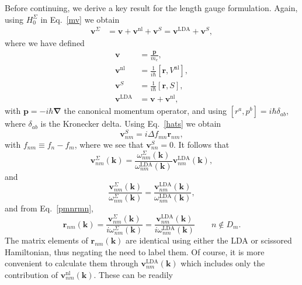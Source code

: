 \documentclass[floatfix,prb,aps,superscriptaddress,showpacs,letterpaper]{revtex4}
\begin{document}
Before continuing,
we derive a key result for the length gauge formulation. 
Again, using $H^\Sigma_0$ in
Eq.~\eqref{mv} we obtain
\begin{align}
\mathbf{v}^\Sigma&=
\mathbf{v} 
+
\mathbf{v}^\mathrm{nl} 
+\mathbf{v}^S
=
\mathbf{v}^\mathrm{LDA} 
+\mathbf{v}^S 
,
\label{vop2}
\end{align}
where we have defined 
\begin{align}
\mathbf{v} 
&=\frac{\mathbf{p}}{m_e},
\nonumber\\
\mathbf{v}^\mathrm{nl} 
&=
\frac{1}{i\hbar}[\mathbf{r},V^\mathrm{nl}],\label{vnl}
\\
\mathbf{v}^S
&=
\frac{1}{i\hbar}[\mathbf{r}, S],
\nonumber\\
\mathbf{v}^\mathrm{LDA} 
&=
\mathbf{v} 
+\mathbf{v}^\mathrm{nl}
,\nonumber
\end{align}  
with $\mathbf{p}=-i\hbar\boldsymbol{\nabla}$ the canonical momentum operator, 
and using $[r^a,p^b]=i\hbar\delta_{ab}$, where $\delta_{ab}$ is the Kronecker delta.
Using Eq.~\eqref{hats} we obtain 
\begin{equation}
\mathbf{v}^S_{nm}=i\Delta f_{mn}\mathbf{r}_{nm},
\label{chon.2} 
\end{equation}
with $f_{nm}\equiv f_n-f_m$,
where we see that $\mathbf{v}^S_{nn}=0$. It follows that
\begin{equation}
\mathbf{v}^\Sigma_{nm}(\mathbf{k}) 
=\frac{\omega^\Sigma_{nm}(\mathbf{k})}{\omega^\mathrm{LDA}_{nm}(\mathbf{k})}
\mathbf{v}^\mathrm{LDA}_{nm}(\mathbf{k}) 
,
\label{chon.9}
\end{equation}
and
\begin{equation*}
\frac{\mathbf{v}^\Sigma_{nm}(\mathbf{k})}{\omega^\Sigma_{nm}(\mathbf{k})}
=
\frac{\mathbf{v}^\mathrm{LDA}_{nm}(\mathbf{k})}{\omega^\mathrm{LDA}_{nm}(\mathbf{k})}
,
\end{equation*}
and from Eq.~\eqref{pmnrmn},
\begin{equation}
\mathbf{r}_{nm}(\mathbf{k}) 
=
\frac{\mathbf{v}^\Sigma_{nm}(\mathbf{k})}{i\omega^\Sigma_{nm}(\mathbf{k})}
=
\frac{\mathbf{v}^\mathrm{LDA}_{nm}(\mathbf{k})}{i\omega^\mathrm{LDA}_{nm}(\mathbf{k})}
\quad\quad n\notin D_m 
. 
\label{chon.10}
\end{equation}
The matrix elements 
of $\mathbf{r}_{nm}(\mathbf{k})$ are identical using either
the LDA or scissored
Hamiltonian, thus negating the need to label them.
Of course, it is more convenient to calculate them
through $\mathbf{v}^\mathrm{LDA}_{nm}(\mathbf{k})$ which 
includes only the contribution of 
$\mathbf{v}^\mathrm{nl}_{nm}(\mathbf{k})$. These can be readily
\end{document}
